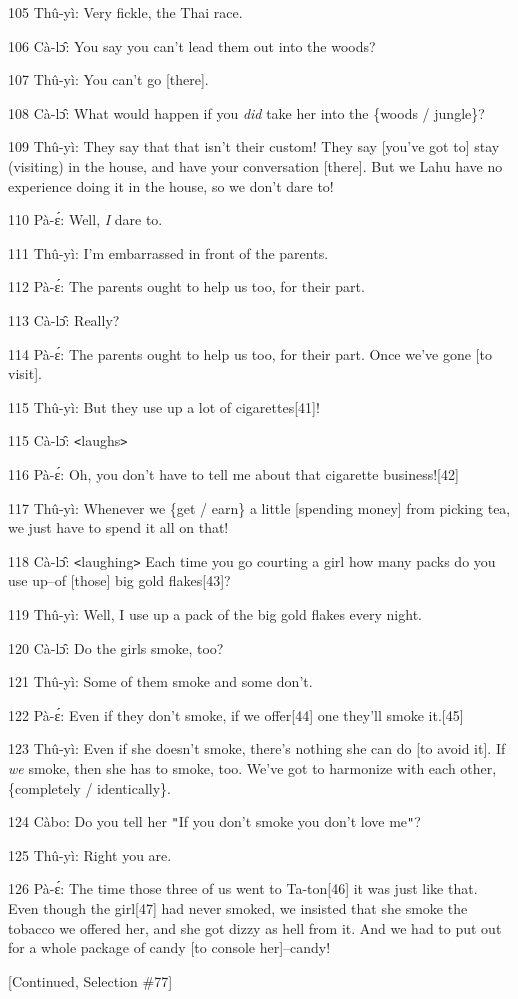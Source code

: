 105 Thû-yì: Very fickle, the Thai race.

106 Cà-lɔ̂: You say you can't lead them out into the woods?

107 Thû-yì: You can't go [there].

108 Cà-lɔ̂: What would happen if you \textit{did} take her into the \{woods
/ jungle\}?

109 Thû-yì: They say that that isn't their custom! They say [you've got to] stay
(visiting) in the house, and have your conversation [there]. But we Lahu have no
experience doing it in the house, so we don't dare to!

110 Pà-ɛ́: Well,\textit{ I} dare to.

111 Thû-yì: I'm embarrassed in front of the parents.

112 Pà-ɛ́: The parents ought to help us too, for their part.

113 Cà-lɔ̂: Really?

114 Pà-ɛ́: The parents ought to help us too, for their part. Once we've gone
[to visit].

115 Thû-yì: But they use up a lot of cigarettes[41]!

115 Cà-lɔ̂: \texttt{<}laughs\texttt{>}

116 Pà-ɛ́: Oh, you don't have to tell me about that cigarette business![42]

117 Thû-yì: Whenever we \{get / earn\} a little [spending money] from picking
tea, we just have to spend it all on that!

118 Cà-lɔ̂: \texttt{<}laughing\texttt{>} Each time you go courting a girl how
many packs do you use up--of [those] big gold flakes[43]?

119 Thû-yì: Well, I use up a pack of the big gold flakes every night.

120 Cà-lɔ̂: Do the girls smoke, too?

121 Thû-yì: Some of them smoke and some don't.

122 Pà-ɛ́: Even if they don't smoke, if we offer[44] one they'll smoke it.[45]

123 Thû-yì: Even if she doesn't smoke, there's nothing she can do [to avoid it].
If \textit{we} smoke, then she has to smoke, too. We've got to harmonize with each
other, \{completely / identically\}.

124 Càbo: Do you tell her \texttt{"}If you don't smoke you don't love me\texttt{"}?

125 Thû-yì: Right you are.

126 Pà-ɛ́: The time those three of us went to Ta-ton[46] it was just like that.
Even though the girl[47] had never smoked, we insisted that she smoke the tobacco
we offered her, and she got dizzy as hell from it. And we had to put out for a
whole package of candy [to console her]--candy!

[Continued, Selection \#77]

